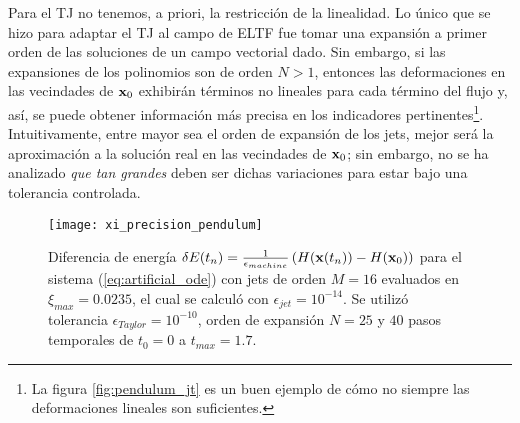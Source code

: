 Para el TJ no tenemos, a priori, la restricción de la linealidad. Lo único que se hizo para adaptar el TJ al campo de ELTF fue tomar una expansión a primer orden de las soluciones de un campo vectorial dado. Sin embargo, si las expansiones de los polinomios son de orden $N > 1$, entonces las deformaciones en las vecindades de $\mathbf{x}_0$ exhibirán términos no lineales para cada término del flujo y, así, se puede obtener información más precisa en los indicadores pertinentes\footnote{La figura \ref{fig:pendulum_jt} es un buen ejemplo de cómo no siempre las deformaciones lineales son suficientes.}. Intuitivamente, entre mayor sea el orden de expansión de los jets, mejor será la aproximación a la solución real en las vecindades de $\mathbf{x}_0$; sin embargo, no se ha analizado \textit{que tan grandes} deben ser dichas variaciones para estar bajo una tolerancia controlada.

\begin{figure}[h!]
	\centering
	\texttt{[image: xi\_precision\_pendulum]}
	\caption{Diferencia de energía $\delta E(t_n) = \frac{1}{\epsilon_{machine}} \left( H(\mathbf{x}(t_n)) - H(\mathbf{x}_0) \right)$ para el sistema (\ref{eq:artificial_ode}) con jets de orden $M=16$ evaluados en $\xi_{max} = 0.0235$, el cual se calculó con $\epsilon_{jet} = 10^{-14}$. Se utilizó tolerancia $\epsilon_{Taylor} = 10^{-10}$, orden de expansión $N = 25$ y $40$ pasos temporales de $t_0 = 0$ a $t_{max} = 1.7$.}
	\label{fig:xi_precision_pendulum}
\end{figure}


